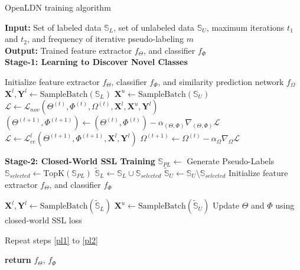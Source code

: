 \documentclass[runningheads]{eccv2022submission}
\begin{document}
\begin{algorithm}[h]
\caption{OpenLDN training algorithm}
\label{alg: alogirthm1}
\textbf{Input:} Set of labeled data $\mathbb{S}_L$, set of unlabeled data $\mathbb{S}_U$, maximum iterations $t_1$ and $t_2$, and frequency of iterative pseudo-labeling $m$ \\
\textbf{Output:} Trained feature extractor $f_{\Theta}$, and classifier $f_{\Phi}$ \\

\textbf{\hskip 5.7mm Stage-1: Learning to Discover Novel Classes}
\begin{algorithmic}[1]
\State Initialize feature extractor $f_{\Theta}$, classifier $f_{\Phi}$, and similarity prediction network $f_{\Omega}$
  \State $\mathbf{X}^l, \mathbf{Y}^l \gets \mathrm{SampleBatch}(\mathbb{S}_L)$
  \State $\mathbf{X}^u \gets \mathrm{SampleBatch}(\mathbb{S}_U)$ 
  \State $\mathcal{L}\gets\mathcal{L}_{nov}({\Theta}^{(t)}, {\Phi}^{(t)}, {\Omega}^{(t)}, \mathbf{X}^l, \mathbf{X}^u, \mathbf{Y}^l)$ 
  \State $({\Theta}^{(t+1)}, {\Phi}^{(t+1)}) \gets ({\Theta}^{(t)}, {\Phi}^{(t)}) - \alpha_{({\Theta}, {\Phi})}\nabla_{({\Theta}, {\Phi})}\mathcal{L}$
  \State $\mathcal{L}\gets\mathcal{L}_{ce}^l({\Theta}^{(t+1)}, {\Phi}^{(t+1)}, \mathbf{X}^l, \mathbf{Y}^l)$
  \State ${\Omega}^{(t+1)} \gets {\Omega}^{(t)} - \alpha_{\Omega}\nabla_{\Omega}\mathcal{L}$
 
\EndFor


\noindent
\textbf{Stage-2: Closed-World SSL Training}
\State $\mathbb{S}_{PL} \gets$ Generate Pseudo-Labels  \label{pl1}
\State $\mathbb{S}_{selected} \gets \mathrm{TopK}(\mathbb{S}_{PL})$ 
\State $\mathbb{\tilde{S}}_L \gets \mathbb{S}_L \cup \mathbb{S}_{selected}$
\State $\mathbb{\tilde{S}}_U \gets \mathbb{S}_U \setminus \mathbb{S}_{selected}$ \label{pl2}
\State Initialize feature extractor $f_{\Theta}$, and classifier $f_{\Phi}$



  \State $\mathbf{X}^l, \mathbf{Y}^l \gets \mathrm{SampleBatch}(\mathbb{\tilde{S}}_L)$
  \State $\mathbf{X}^u \gets \mathrm{SampleBatch}(\mathbb{\tilde{S}}_U)$
\State Update $\Theta$ and $\Phi$ using closed-world SSL loss
  
    \State Repeat steps \ref{pl1} to \ref{pl2}
\EndIf
 \EndFor

\State \textbf{return} $f_{\Theta}$, $f_{\Phi}$


\end{algorithmic}
\end{algorithm}
\end{document}
